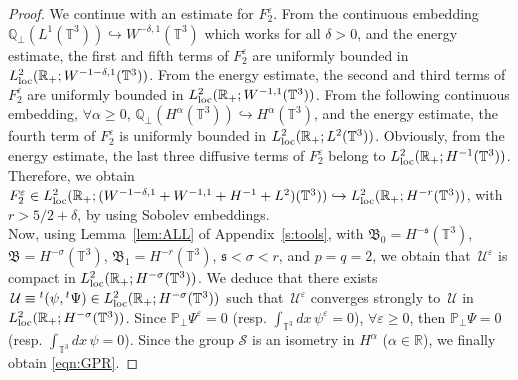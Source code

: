 \documentclass[11pt,reqno]{amsart}
\def \R{{\mathbb{R}}}
\def \Q{{\mathbb{Q}}}
\def \T{{\mathbb{T}}}
\def \P{{\mathbb{P}}}
\begin{document}
\begin{proof}
    We continue with an  estimate for  $F_2^\varepsilon$. From the continuous embedding $\Q_\perp (L^1(\T^3)) \hookrightarrow W^{-\delta,1}(\T^3)$ which works for all $ \delta >0$, and the energy estimate, the first and fifth terms of $F_2^\varepsilon$ are uniformly bounded in $L_{\rm loc}^{2}(\R_+; W^{-1-\delta,1}(\T^3))$. From the energy estimate, the second and third terms of $F_2^\varepsilon$ are uniformly bounded in $L_{\rm loc}^{2}(\R_+; W^{-1,1}(\T^3))$. From the following continuous embedding,  $\forall \alpha\geq 0$, $\Q_\perp (H^{\alpha}(\T^3)) \hookrightarrow H^{\alpha}(\T^3)$, and the energy estimate, the fourth term of $F_2^\varepsilon$ is uniformly bounded in $L_{\rm loc}^{2}(\R_+;L^2(\T^3))$. Obviously, from the energy estimate, the last three diffusive terms of $F_2^\varepsilon$ belong to $L_{\rm loc}^{2}(\R_+; H^{-1}(\T^3))$. Therefore, we obtain $F_2^\varepsilon \in  L_{\rm loc}^{2}(\R_+; (W^{-1-\delta,1}+W^{-1,1}+H^{-1} + L^2)(\T^3)) \hookrightarrow  L_{\rm loc}^{2}(\R_+; H^{-r}(\T^3)) $, with $r>5/2+\delta $, by using Sobolev embeddings. \\
    Now, using Lemma~\ref{lem:ALL} of Appendix~\ref{s:tools}, with $\mathfrak B_0 = H^{- \mathfrak s}(\T^3)$,  $\mathfrak B = H^{-\sigma}(\T^3)$,  $\mathfrak B_1 = H^{-r}(\T^3)$,  $ \mathfrak s <\sigma < r $, and $p=q=2$, we obtain that $\, \mathcal U^\varepsilon$ is compact in $ L_{\rm loc}^{2}(\R_+; H^{-\sigma}(\T^3))$. We deduce that there exists $\, \mathcal U\equiv {}^t(\psi, {}^t\Psi) \in L_{\rm loc}^{2}(\R_+; H^{-\sigma}(\T^3))$ such that $\, \mathcal U^\varepsilon$ converges strongly to  $\, \mathcal U$ in $ L_{\rm loc}^{2}(\R_+; H^{-\sigma}(\T^3))$. Since $\P_\perp \Psi^\varepsilon =0$ (resp. $\int_{\T^3} dx\, \psi^\varepsilon=0$), $\forall \varepsilon \geq 0$, then $\P_\perp \Psi =0$ (resp. $\int_{\T^3} dx\, \psi=0$). Since  the group $\mathcal S$ is an isometry in $H^{\alpha}$ ($\alpha\in \R$), we finally obtain \eqref{eqn:GPR}.


\end{proof}
\end{document}
